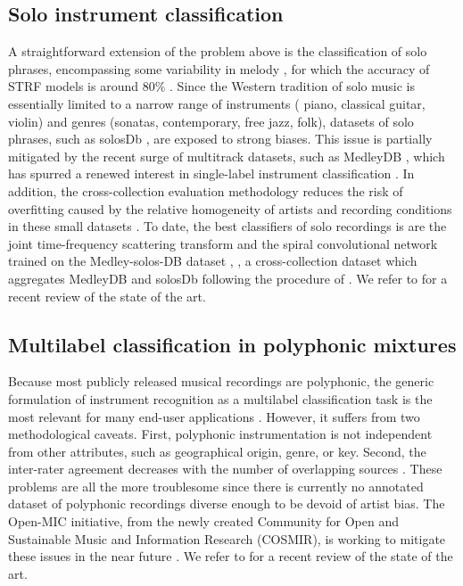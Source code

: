 \subsection{Solo instrument classification}
A straightforward extension of the problem above is the classification of solo phrases, encompassing some variability in melody \cite{krishna2004icassp}, for which the accuracy of STRF models is around $80\%$ \cite{patil2015eurasip}.
Since the Western tradition of solo music is essentially limited to a narrow range of instruments (\eg{} piano, classical guitar, violin) and genres (sonatas, contemporary, free jazz, folk), datasets of solo phrases, such as solosDb \cite{joder2009taslp}, are exposed to strong biases.
This issue is partially mitigated by the recent surge of multitrack datasets, such as MedleyDB \cite{bittner2014ismir}, which has spurred a renewed interest in single-label instrument classification \cite{yip2017ismir}.
In addition, the cross-collection evaluation methodology \cite{livshin2003ismir} reduces the risk of overfitting caused by the relative homogeneity of artists and recording conditions in these small datasets \cite{bogdanov2016ismir}.
To date, the best classifiers of solo recordings is are the joint time-frequency scattering transform \cite{anden2018tsp} and the spiral convolutional network \cite{lostanlen2016ismir} trained on the Medley-solos-DB dataset \cite{lostanlen2018msdb}, \ie{}, a cross-collection dataset which aggregates MedleyDB and solosDb following the procedure of \cite{donnelly2015icdmw}.
We refer to \cite{han2017taslp} for a recent review of the state of the art.

\subsection{Multilabel classification in polyphonic mixtures}
Because most publicly released musical recordings are polyphonic, the generic formulation of instrument recognition as a multilabel classification task is the most relevant for many end-user applications \cite{martins2007ismir,burred2009icassp}.
However, it suffers from two methodological caveats.
First, polyphonic instrumentation is not independent from other attributes, such as geographical origin, genre, or key.
Second, the inter-rater agreement decreases with the number of overlapping sources \cite[chapter 6]{fuhrmann2012phd}.
These problems are all the more troublesome since there is currently no annotated dataset of polyphonic recordings diverse enough to be devoid of artist bias.
The Open-MIC initiative, from the newly created Community for Open and Sustainable Music and Information Research (COSMIR), is working to mitigate these issues in the near future \cite{mcfee2016ismir}.
We refer to \cite{humphrey2018ismir} for a recent review of the state of the art.

